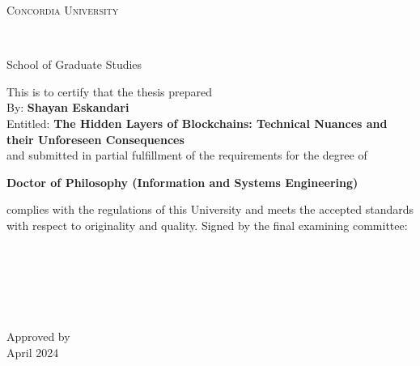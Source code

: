 
\thispagestyle{empty} %

\begin{center}\begin{Large} \textsc{Concordia University} \end{Large} \\
\begin{large} School of Graduate Studies \end{large} \end{center}
\vfill
This is to certify that the thesis prepared\\
By: \tab   \textbf{Shayan Eskandari} \\
Entitled: \tab \textbf{The Hidden Layers of Blockchains: Technical Nuances and their Unforeseen Consequences}\\
 and submitted in partial fulfillment of the requirements for the degree of
\begin{center}
\textbf{Doctor of Philosophy (Information and Systems Engineering)}
\end{center}
complies with the regulations of this University and meets the
accepted standards with respect to originality and quality.
\vfill
\noindent Signed by the final examining committee: \\[1.3em] %
\hspace*{1cm} \hrulefill {} \\[1.3em]
\hspace*{1cm} \hrulefill {} \\[1.3em]
\hspace*{1cm} \hrulefill {} \\[1.3em]
\hspace*{1cm} \hrulefill {} \\[1.3em]
\hspace*{1cm} \hrulefill {} \\[1.3em]
\hspace*{1cm} \hrulefill {} \\[1.3em]
\vfill
\noindent Approved by \hrulefill \\[1.3em]
 April 2024 \hrulefill \\




